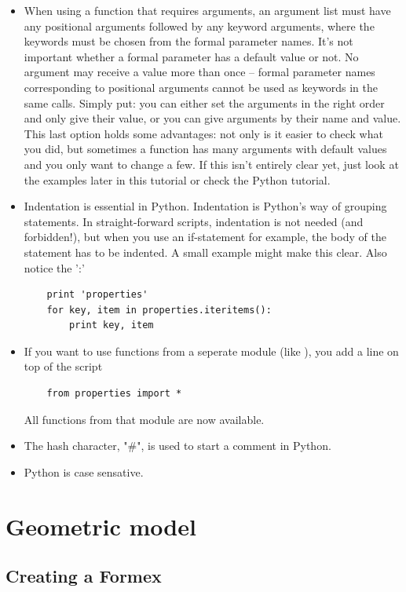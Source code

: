\documentclass[a4paper]{manual}
\begin{document}
{\begin{itemize}
	\begin{itemize}
	\item When using a function that requires arguments, an argument list must have any positional arguments followed by any keyword arguments, where the keywords must be chosen from the formal parameter names. It's not important whether a formal parameter has a default value or not. No argument may receive a value more than once -- formal parameter names corresponding to positional arguments cannot be used as keywords in the same calls. 
Simply put: you can either set the arguments in the right order and only give their value, or you can give arguments by their name and value. This last option holds some advantages: not only is it easier to check what you did, but sometimes a function has many arguments with default values and you only want to change a few.
If this isn't entirely clear yet, just look at the examples later in this tutorial or check the Python tutorial.
	\item Indentation is essential in Python. Indentation is Python's way of grouping statements. In straight-forward scripts, indentation is not needed (and forbidden!), but when you use an if-statement for example, the body of the statement has to be indented. A small example might make this clear. Also notice the ':' 
\begin{verbatim}
	print 'properties'
	for key, item in properties.iteritems():
	    print key, item
\end{verbatim}
	\item If you want to use functions from a seperate module (like ), you add a line on top of the script
\begin{verbatim}
	from properties import *
\end{verbatim}
All functions from that module are now available.
	\item The hash character, "\#", is used to start a comment in Python.
	\item Python is case sensative.
	\end{itemize}
\end{itemize}


\section{Geometric model}
\label{sec:geom}


\subsection{Creating a Formex}
\label{subsec:create}

}
\end{document}
